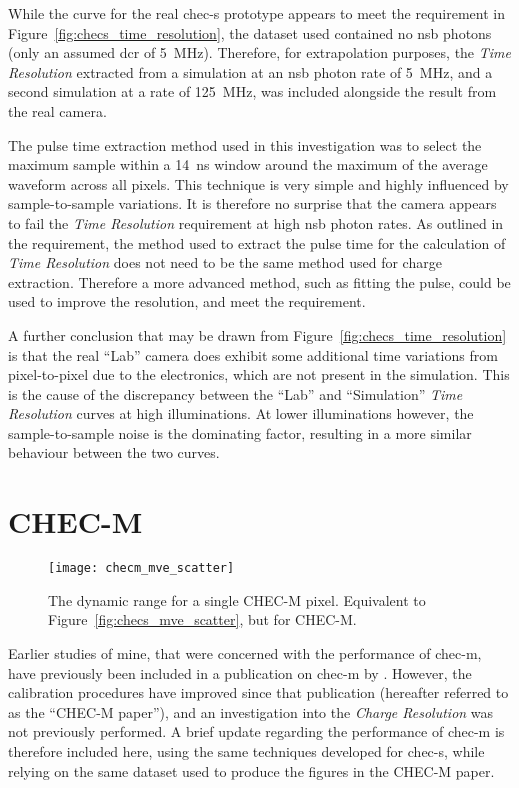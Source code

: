 While the curve for the real \gls{chec-s} prototype appears to meet the requirement in Figure~\ref{fig:checs_time_resolution}, the dataset used contained no \gls{nsb} photons (only an assumed \gls{dcr} of \SI{5}{MHz}). Therefore, for extrapolation purposes, the \textit{Time Resolution} extracted from a simulation at an \gls{nsb} photon rate of \SI{5}{MHz}, and a second simulation at a rate of \SI{125}{MHz}, was included alongside the result from the real camera.

The pulse time extraction method used in this investigation was to select the maximum sample within a \SI{14}{ns} window around the maximum of the average waveform across all pixels. This technique is very simple and highly influenced by sample-to-sample variations. It is therefore no surprise that the camera appears to fail the \textit{Time Resolution} requirement at high \gls{nsb} photon rates. As outlined in the requirement, the method used to extract the pulse time for the calculation of \textit{Time Resolution} does not need to be the same method used for charge extraction. Therefore a more advanced method, such as fitting the pulse, could be used to improve the resolution, and meet the requirement.

A further conclusion that may be drawn from Figure~\ref{fig:checs_time_resolution} is that the real ``Lab'' camera does exhibit some additional time variations from pixel-to-pixel due to the electronics, which are not present in the simulation. This is the cause of the discrepancy between the ``Lab'' and ``Simulation'' \textit{Time Resolution} curves at high illuminations. At lower illuminations however, the sample-to-sample noise is the dominating factor, resulting in a more similar behaviour between the two curves.

\section{CHEC-M}

\begin{figure}
	\centering
    \texttt{[image: checm\_mve\_scatter]} 
	\caption[CHEC-M average measured charge versus average expected charge.]{The dynamic range for a single CHEC-M pixel. Equivalent to Figure~\ref{fig:checs_mve_scatter}, but for CHEC-M.}
	\label{fig:checm_mve_scatter}
\end{figure}

Earlier studies of mine, that were concerned with the performance of \gls{chec-m}, have previously been included in a publication on \gls{chec-m} by \textcite{Zorn2017}. However, the calibration procedures have improved since that publication (hereafter referred to as the ``CHEC-M paper''), and an investigation into the \textit{Charge Resolution} was not previously performed. A brief update regarding the performance of \gls{chec-m} is therefore included here, using the same techniques developed for \gls{chec-s}, while relying on the same dataset used to produce the figures in the CHEC-M paper.

